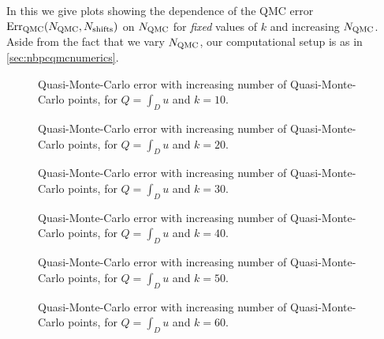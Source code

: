 In this  we give plots showing the dependence of the QMC error $\QMCerror{\NQMC}{\Nshifts}$ on $N_{\mathrm{QMC}}$ for \emph{fixed} values of $k$ and increasing $N_{\mathrm{QMC}}$. Aside from the fact that we vary $N_{\mathrm{QMC}}$, our computational setup is as in \cref{sec:nbpcqmcnumerics}.

\begin{figure}[h]
    \centering
    
    \caption[Quasi-Monte-Carlo error, for $Q=\int_D u$ and $k=10$.]{Quasi-Monte-Carlo error with increasing number of Quasi-Monte-Carlo points, for $Q=\int_D u$ and $k=10$. \label{fig:qmcintegral10}}
  \end{figure}
\begin{figure}[h]
  \centering

\caption[Quasi-Monte-Carlo error, for $Q=\int_D u$ and $k=20$.]{Quasi-Monte-Carlo error with increasing number of Quasi-Monte-Carlo points, for $Q=\int_D u$ and $k=20$. \label{fig:qmcintegral20}}
\end{figure}
\begin{figure}[h]
    \centering
    
    \caption[Quasi-Monte-Carlo error, for $Q=\int_D u$ and $k=30$.]{Quasi-Monte-Carlo error with increasing number of Quasi-Monte-Carlo points, for $Q=\int_D u$ and $k=30$. \label{fig:qmcintegral30}}
\end{figure}
\begin{figure}[h]
  \centering

\caption[Quasi-Monte-Carlo error, for $Q=\int_D u$ and $k=40$.]{Quasi-Monte-Carlo error with increasing number of Quasi-Monte-Carlo points, for $Q=\int_D u$ and $k=40$. \label{fig:qmcintegral40}}
\end{figure}
\begin{figure}[h]
    \centering
    
    \caption[Quasi-Monte-Carlo error, for $Q=\int_D u$ and $k=50$.]{Quasi-Monte-Carlo error with increasing number of Quasi-Monte-Carlo points, for $Q=\int_D u$ and $k=50$. \label{fig:qmcintegral50}}
  \end{figure}
\begin{figure}[h]
  \centering

\caption[Quasi-Monte-Carlo error, for $Q=\int_D u$ and $k=60$.]{Quasi-Monte-Carlo error with increasing number of Quasi-Monte-Carlo points, for $Q=\int_D u$ and $k=60$. \label{fig:qmcintegral60}}
\end{figure}


